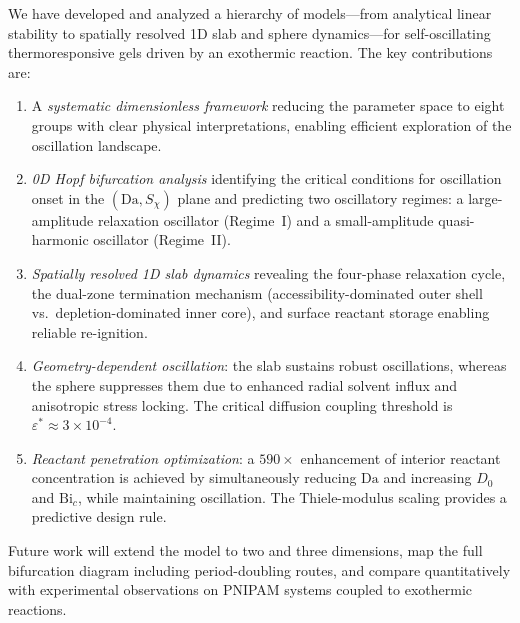 \documentclass[aps,pre,reprint,superscriptaddress,longbibliography,floatfix]{revtex4-2}
\newcommand{\Da}{\mathrm{Da}}
\newcommand{\Bi}{\mathrm{Bi}}
\begin{document}
We have developed and analyzed a hierarchy of models---from analytical
linear stability to spatially resolved 1D slab and sphere dynamics---for self-oscillating
thermoresponsive gels driven by an exothermic reaction. The key
contributions are:
\begin{enumerate}
  \item A \emph{systematic dimensionless framework} reducing the
    parameter space to eight groups with clear physical interpretations,
    enabling efficient exploration of the oscillation landscape.
  \item \emph{0D Hopf bifurcation analysis} identifying the critical
    conditions for oscillation onset in the $(\Da,S_\chi)$ plane and
    predicting two oscillatory regimes: a large-amplitude relaxation
    oscillator (Regime~I) and a small-amplitude quasi-harmonic oscillator
    (Regime~II).
  \item \emph{Spatially resolved 1D slab dynamics} revealing the
    four-phase relaxation cycle, the dual-zone termination mechanism
    (accessibility-dominated outer shell vs.\ depletion-dominated inner
    core), and surface reactant storage enabling reliable re-ignition.
  \item \emph{Geometry-dependent oscillation}: the slab sustains robust
    oscillations, whereas the sphere suppresses them due to enhanced
    radial solvent influx and anisotropic stress locking. The critical
    diffusion coupling threshold is $\varepsilon^*\approx 3\times
    10^{-4}$.
  \item \emph{Reactant penetration optimization}: a $590\times$
    enhancement of interior reactant concentration is achieved by
    simultaneously reducing $\Da$ and increasing $D_0$ and $\Bi_c$,
    while maintaining oscillation. The Thiele-modulus scaling provides
    a predictive design rule.
\end{enumerate}

Future work will extend the model to two and three dimensions, map the
full bifurcation diagram including period-doubling routes, and compare
quantitatively with experimental observations on PNIPAM systems coupled
to exothermic reactions.

\begin{acknowledgments}
\end{acknowledgments}
\end{document}
